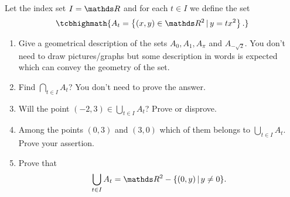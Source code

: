 \documentclass[11pt]{article}
\newcounter{Quesnumb}  %
\newcommand{\problemnum}{%
            \addtocounter{Quesnumb}{1}%
            \arabic{Quesnumb}}
\begin{document}
\begin{problem}{\problemnum}
 Let the index set $I=\bbR$ and for each $t \in I$ we define the set
 \[\tcbhighmath{A_t = \left\{(x,y) \in \bbR^2 \, | \, y=tx^2\right\}.}\]
 \begin{enumerate}[label=\alph*).]
    \item Give a geometrical description of the sets $A_{0}, A_{1}, A_{\pi}$ and $A_{-\sqrt{2}}$. You don't need to draw pictures/graphs but some description in words is expected which can convey the geometry of the set.
    \item Find $\displaystyle \bigcap_{t \in I} A_t$? You don't need to prove the answer.
    \item Will the point $(-2,3) \in \displaystyle \bigcup_{t \in I} A_t$? Prove or disprove.
    \item Among the points $(0,3)$ and $(3,0)$ which of them belongs to $\displaystyle \bigcup_{t \in I} A_t$. Prove your assertion.
    \item Prove that
    \[\bigcup_{t \in I} A_t =\bbR^2 - \{(0,y) \, | \, y \neq 0\}.\]
 \end{enumerate}
\end{problem}
\end{document}
